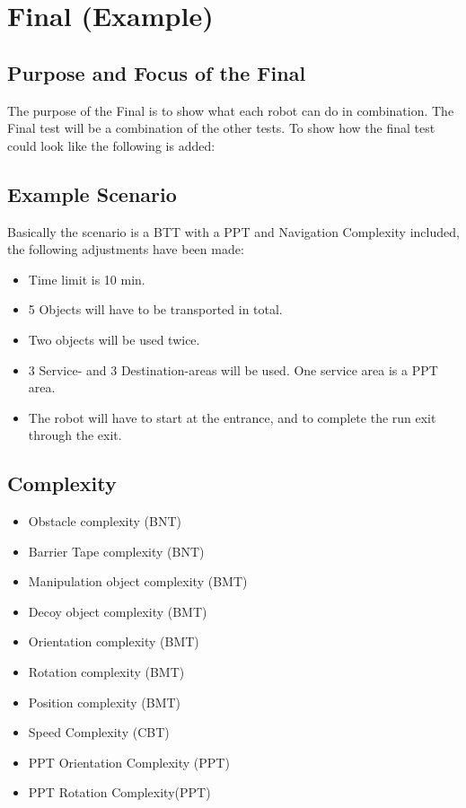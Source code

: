 \section{Final (Example)}

\subsection{Purpose and Focus of the Final}
The purpose of the Final is to show what each robot can do in combination. The Final test will be a combination of the other tests. To show how the final test could look like the following is added:

\subsection{Example Scenario}

Basically the scenario is a BTT with a PPT and Navigation Complexity included, the following adjustments have been made:

\begin{itemize}
\item Time limit is 10 min. 
\item 5 Objects will have to be transported in total. 
\item Two objects will be used twice. 
\item 3 Service- and 3 Destination-areas will be used. One service area is a PPT area.
\item The robot will have to start at the entrance, and to complete the run exit through the exit.  
\end{itemize}


\subsection{Complexity}
	
\begin{itemize}
\item Obstacle complexity (BNT)
\item Barrier Tape complexity (BNT)
\item Manipulation object complexity (BMT)
\item Decoy object complexity (BMT)
\item Orientation complexity (BMT)
\item Rotation complexity (BMT)
\item Position complexity (BMT)
\item Speed Complexity (CBT)
\item PPT Orientation Complexity (PPT)
\item PPT Rotation Complexity(PPT)
\end{itemize}

